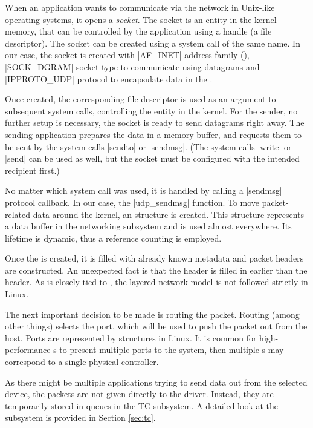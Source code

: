 When an application wants to communicate via the network in Unix-like operating
systems, it opens a \emph{socket}. The socket is an entity in the kernel memory, that
can be controlled by the application using a handle (a file descriptor). The
socket can be created using a system call of
the same name. In our case, the socket is created with \macro|AF_INET| address
family (), \macro|SOCK_DGRAM| socket type to communicate using
datagrams and \macro|IPPROTO_UDP| protocol to encapsulate data in the .

Once created, the corresponding file descriptor is used as an argument to
subsequent system calls, controlling the entity in the kernel. For the sender,
no further setup is necessary, the socket is ready to send datagrams right away.
The sending application prepares the data in a memory buffer, and requests them
to be sent by the system calls \fnc|sendto| or \fnc|sendmsg|. (The system calls
\fnc|write| or \fnc|send| can be used as well, but the socket must be
configured with the intended recipient first.)

No matter which system call was used, it is handled by calling a \fnc|sendmsg|
protocol callback. In our case, the \fnc|udp_sendmsg| function. To move
packet-related data around the kernel, an \skb{} structure is created. This
structure represents a data buffer in the networking subsystem and is used
almost everywhere. Its lifetime is dynamic, thus a reference counting is
employed.

Once the \skb{} is created, it is filled with already known metadata and packet
headers are constructed. An unexpected fact is that the  header is
filled in earlier than the  header. As  is closely tied to
, the layered network model is not followed strictly in Linux.

The next important decision to be made is routing the packet. Routing (among
other things) selects the port, which will be used to push the packet out from
the host. Ports are represented by \netdev{} structures in Linux. It is common
for high-performance s to present multiple ports to the system, then
multiple \netdev s may correspond to a single physical controller.

As there might be multiple applications trying to send data out from the
selected device, the packets are not given directly to the driver. Instead,
they are temporarily stored in queues in the \acrfull{TC} subsystem. A detailed
look at the subsystem is provided in Section \ref{sec:tc}.

